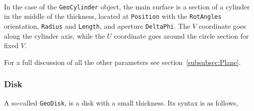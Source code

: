 ~\\
In the case of the {\tt GeoCylinder} object, the main surface is a section of a cylinder in the middle of the thickness, 
located at {\tt Position} with the {\tt RotAngles} orientation, {\tt Radius} and {\tt Length}, and aperture {\tt DeltaPhi}. 
The $V$ coordinate goes along the cylinder axis, while the $U$ coordinate goes around the circle section for fixed $V$.

For a full discussion of all the other parameters see section~\ref{subsubsec:Plane}.

\subsubsection{Disk}

A so-called {\tt GeoDisk}, is a disk with a small thickness. Its syntax is as follows,

